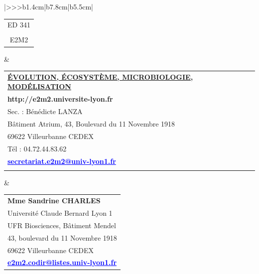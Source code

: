 \begin{center}
\begin{tabular}{|>{\centering}>{}>{\color{txtED}}b{1.4cm}|b{7.8cm}|b{5.5cm}|}
\hline	
	\begin{tabular}{@{}c@{}}
		ED 341\\
		\\
		E2M2\end{tabular}&
	\begin{tabular}{@{}l@{}}
		\\
		\textbf{\underline{ÉVOLUTION, ÉCOSYSTÈME, MICROBIOLOGIE, MODÉLISATION}}\\[.2cm]
		\textcolor{siteED}{\textbf{http://e2m2.universite-lyon.fr }}\\
		Sec. : Bénédicte LANZA\\
		Bâtiment Atrium, 43, Boulevard du 11 Novembre 1918\\
		69622 Villeurbanne CEDEX\\
		Tél : 04.72.44.83.62\\
		\textcolor{blue}{\underline{\textbf{secretariat.e2m2@univ-lyon1.fr}}}\\
		\\
	\end{tabular}&
	\begin{tabular}{@{}l@{}}
		\textcolor{txtED}{\textbf{Mme Sandrine CHARLES }}\\
		Université Claude Bernard Lyon 1\\
		UFR Biosciences, Bâtiment Mendel\\
		43, boulevard du 11 Novembre 1918\\
		69622 Villeurbanne CEDEX\\
		\textcolor{blue}{\underline{\textbf{e2m2.codir@listes.univ-lyon1.fr}}}\\
	\end{tabular}\\
	

\end{tabular}
\end{center}
